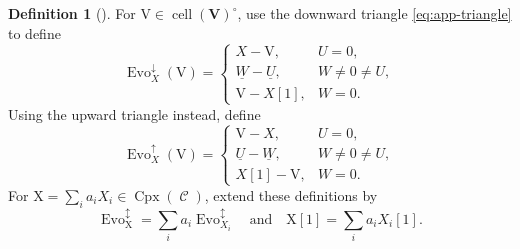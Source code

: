 \documentclass[11pt,reqno]{amsart}
\theoremstyle{plain}
\theoremstyle{definition}
\newtheorem{definition}[theorem]{Definition}
\numberwithin{equation}{section}
\newcommand\hua{\mathcal}
\newcommand\<{\langle}
\renewcommand\>{\rangle}
\newcommand{\C}{\operatorname{\hua{C}}} %
\newcommand{\on}[1]{\operatorname{#1}}
\def\CCx{\on{Cpx}}   %
\def\cc{\on{cell}}  %
\def\sink{X}
\newcommand{\Dflow}[1]{\on{Evo}^{\downarrow}_{#1}}
\newcommand{\Uflow}[1]{\on{Evo}^{\uparrow}_{#1}}
\newcommand{\DUflow}[1]{\on{Evo}^{\updownarrow}_{#1}}
\newcommand{\pcts}[1]{\mathbf{#1}}%
\newcommand{\ccpt}[1]{\mathrm{#1}}%
\newcommand{\real}[1]{\underline{#1}}%
\def\xevo{\ccpt{X}}%
\def\coex{a}
\begin{document}
\begin{definition}[{\cite[Def.~3.9 and Def.~3.11]{QT}}]\label{def:app-flow}
For $\ccpt{V}\in\cc(\pcts{V})^\circ$, use the downward triangle
\eqref{eq:app-triangle} to define
\begin{equation}\label{eq:app-down}
    \Dflow{X}(\ccpt{V})=
    \begin{cases}
        X-\ccpt{V},&U=0,\\
        \real{W}-\real{U},&W\ne0\ne U,\\
        \ccpt{V}-X[1],&W=0.
    \end{cases}
\end{equation}
Using the upward triangle instead, define
\begin{equation}\label{eq:app-up}
    \Uflow{X}(\ccpt{V})=
    \begin{cases}
        \ccpt{V}-X,&U=0,\\
        \real{U}-\real{W},&W\ne0\ne U,\\
        X[1]-\ccpt{V},&W=0.
    \end{cases}
\end{equation}
For $\xevo=\sum_i\coex_iX_i\in\CCx(\C)$, extend these definitions by
\[
    \DUflow{\xevo}=\sum_i\coex_i\DUflow{X_i}
    \quad\text{and}\quad \xevo[1]=\sum_i\coex_iX_i[1].
\]
\end{definition}
\end{document}
